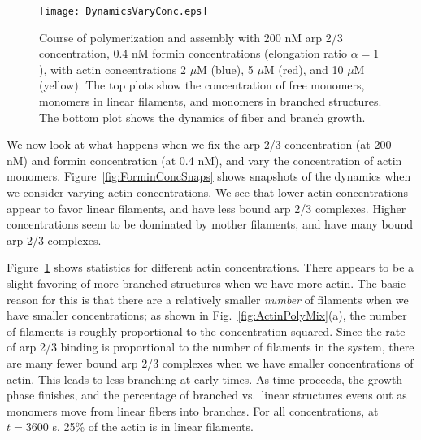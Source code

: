 \documentclass[11pt]{article}
\begin{document}
\begin{figure}
\centering
\texttt{[image: DynamicsVaryConc.eps]}
\caption{\label{fig:ActinConc}Course of polymerization and assembly with 200 nM arp 2/3 concentration, 0.4 nM formin concentrations (elongation ratio $\alpha=1$), with actin concentrations 2 $\mu$M (blue), 5 $\mu$M (red), and 10 $\mu$M (yellow). The top plots show the concentration of free monomers, monomers in linear filaments, and monomers in branched structures. The bottom plot shows the dynamics of fiber and branch growth. }
\end{figure}


We now look at what happens when we fix the arp 2/3 concentration (at 200 nM) and formin concentration (at 0.4 nM), and vary the concentration of actin monomers. Figure\ \ref{fig:ForminConcSnaps} shows snapshots of the dynamics when we consider varying actin concentrations. We see that lower actin concentrations appear to favor linear filaments, and have less bound arp 2/3 complexes. Higher concentrations seem to be dominated by mother filaments, and have many bound arp 2/3 complexes. 

Figure\ \ref{fig:ActinConc} shows statistics for different actin concentrations. There appears to be a slight favoring of more branched structures when we have more actin. The basic reason for this is that there are a relatively smaller \emph{number} of filaments when we have smaller concentrations; as shown in Fig.\ \ref{fig:ActinPolyMix}(a), the number of filaments is roughly proportional to the concentration squared. Since the rate of arp 2/3 binding is proportional to the number of filaments in the system, there are many fewer bound arp 2/3 complexes when we have smaller concentrations of actin. This leads to less branching at early times. As time proceeds, the growth phase finishes, and the percentage of branched vs.\  linear structures evens out as monomers move from linear fibers into branches. For all concentrations, at $t=3600$ s, 25\% of the actin is in linear filaments. 
\end{document}
